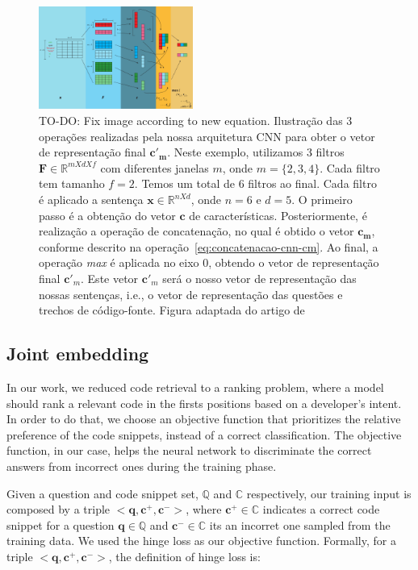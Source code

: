 \documentclass[sigconf]{acmart}
\begin{document}
\begin{figure}[H]
    \centering
    \includegraphics[width=0.45\textwidth]{figuras/cnn-steps-word-embedding.pdf}
    \caption{TO-DO: Fix image according to new equation. Ilustração das 3 operações realizadas pela nossa arquitetura CNN para obter o vetor de representação final $\bm{c'}_{\bm{m}}$. Neste exemplo, utilizamos 3 filtros $\bm{F} \in \mathbb{R}^{m X d X f}$ com diferentes janelas $m$, onde $m = \{2, 3, 4\}$. Cada filtro tem tamanho $f = 2$. Temos um total de 6 filtros ao final. Cada filtro é aplicado a sentença $\bm{x} \in \mathbb{R}^{n X d}$, onde $n = 6$ e $d = 5$. O primeiro passo é a obtenção do vetor $\bm{c}$ de características. Posteriormente, é realização a operação de concatenação, no qual é obtido o vetor $\bm{c}_{\bm{m}}$, conforme descrito na operação~\ref{eq:concatenacao-cnn-cm}. Ao final, a operação \textit{max} é aplicada no eixo $0$, obtendo o vetor de representação final $\bm{c'}_{m}$. Este vetor $\bm{c'}_{m}$ será o nosso vetor de representação das nossas sentenças, i.e., o vetor de representação das questões e trechos de código-fonte. Figura adaptada do artigo de \cite{zhang-guide-convolutional-cnn-embedding-ilustration:2015}}
    \label{fig:cnn-steps-word-embedding}
\end{figure}

\subsection{Joint embedding}
\label{sec:joint-embedding}

In our work, we reduced code retrieval to a ranking problem, where a model should rank a relevant code in the firsts positions based on a developer's intent. In order to do that, we choose an objective function that prioritizes the relative preference of the code snippets, instead of a correct classification. The objective function, in our case, helps the neural network to discriminate the correct answers from incorrect ones during the training phase.


Given a question and code snippet set, $\mathbb{Q}$ and $\mathbb{C}$ respectively, our training input is composed by a triple $<\bm{q}, \bm{c^{+}}, \bm{c^{-}}>$, where $\bm{c^{+}} \in \mathbb{C}$ indicates a correct code snippet for a question $\bm{q} \in \mathbb{Q}$ and $\bm{c^{-}} \in \mathbb{C}$ its an incorret one sampled from the training data. We used the hinge loss as our objective function. Formally, for a triple $<\bm{q}, \bm{c^{+}}, \bm{c^{-}}>$, the definition of hinge loss is:
\end{document}
